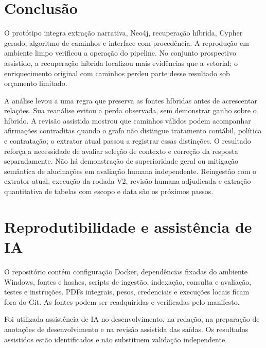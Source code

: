 \documentclass[conference]{IEEEtran}
\begin{document}
\section{Conclusão}

O protótipo integra extração narrativa, Neo4j, recuperação híbrida, Cypher gerado, algoritmo de caminhos e interface com procedência. A reprodução em ambiente limpo verificou a operação do pipeline. No conjunto prospectivo assistido, a recuperação híbrida localizou mais evidências que a vetorial; o enriquecimento original com caminhos perdeu parte desse resultado sob orçamento limitado.

A análise levou a uma regra que preserva as fontes híbridas antes de acrescentar relações. Sua reanálise evitou a perda observada, sem demonstrar ganho sobre o híbrido. A revisão assistida mostrou que caminhos válidos podem acompanhar afirmações contraditas quando o grafo não distingue tratamento contábil, política e contratação; o extrator atual passou a registrar essas distinções. O resultado reforça a necessidade de avaliar seleção de contexto e correção da resposta separadamente. Não há demonstração de superioridade geral ou mitigação semântica de alucinações em avaliação humana independente. Reingestão com o extrator atual, execução da rodada V2, revisão humana adjudicada e extração quantitativa de tabelas com escopo e data são os próximos passos.

\section*{Reprodutibilidade e assistência de IA}

O repositório contém configuração Docker, dependências fixadas do ambiente Windows, fontes e hashes, scripts de ingestão, indexação, consulta e avaliação, testes e instruções. PDFs integrais, pesos, credenciais e execuções locais ficam fora do Git. As fontes podem ser readquiridas e verificadas pelo manifesto.

Foi utilizada assistência de IA no desenvolvimento, na redação, na preparação de anotações de desenvolvimento e na revisão assistida das saídas. Os resultados assistidos estão identificados e não substituem validação independente.
\end{document}
